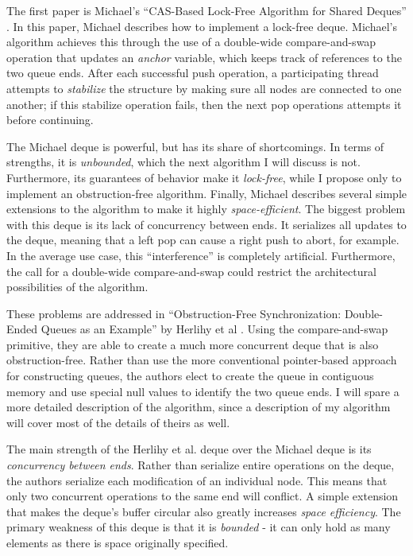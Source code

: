 \documentclass[11pt, letterpaper]{article}
\begin{document}
        The first paper is Michael's ``CAS-Based Lock-Free Algorithm for Shared Deques'' \cite{michael}. In this paper, Michael describes how to implement a lock-free deque. Michael's algorithm achieves this through the use of a double-wide compare-and-swap operation that updates an \emph{anchor} variable, which keeps track of references to the two queue ends. After each successful push operation, a participating thread attempts to \emph{stabilize} the structure by making sure all nodes are connected to one another; if this stabilize operation fails, then the next pop operations attempts it before continuing.

        The Michael deque is powerful, but has its share of shortcomings. In terms of strengths, it is \emph{unbounded}, which the next algorithm I will discuss is not. Furthermore, its guarantees of behavior make it \emph{lock-free}, while I propose only to implement an obstruction-free algorithm. Finally, Michael describes several simple extensions to the algorithm to make it highly \emph{space-efficient}. The biggest problem with this deque is its lack of concurrency between ends. It serializes all updates to the deque, meaning that a left pop can cause a right push to abort, for example. In the average use case, this ``interference'' is completely artificial. Furthermore, the call for a double-wide compare-and-swap could restrict the architectural possibilities of the algorithm.

        These problems are addressed in ``Obstruction-Free Synchronization: Double-Ended Queues as an Example'' by Herlihy et al \cite{herlihy}. Using the compare-and-swap primitive, they are able to create a much more concurrent deque that is also obstruction-free. Rather than use the more conventional pointer-based approach for constructing queues, the authors elect to create the queue in contiguous memory and use special null values to identify the two queue ends. I will spare a more detailed description of the algorithm, since a description of my algorithm will cover most of the details of theirs as well.

        The main strength of the Herlihy et al. deque over the Michael deque is its \emph{concurrency between ends}. Rather than serialize entire operations on the deque, the authors serialize each modification of an individual node. This means that only two concurrent operations to the same end will conflict. A simple extension that makes the deque's buffer circular also greatly increases \emph{space efficiency}. The primary weakness of this deque is that it is \emph{bounded} - it can only hold as many elements as there is space originally specified.
\end{document}
